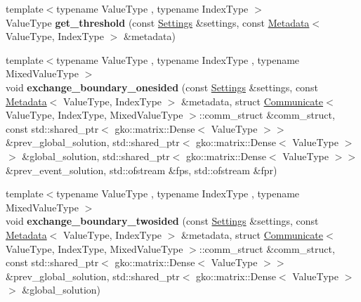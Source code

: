 \begin{DoxyCompactItemize}
\item 
\mbox{\label{namespaceschwz_a77f43267a5630bb5e4a86e9634c69fe9}} 
{\footnotesize template$<$typename Value\+Type , typename Index\+Type $>$ }\\Value\+Type {\bfseries get\+\_\+threshold} (const \hyperlink{structschwz_1_1Settings}{Settings} \&settings, const \hyperlink{structschwz_1_1Metadata}{Metadata}$<$ Value\+Type, Index\+Type $>$ \&metadata)
\item 
\mbox{\label{namespaceschwz_a4e81df68d1918c37ac0c1d4a9a406ba9}} 
{\footnotesize template$<$typename Value\+Type , typename Index\+Type , typename Mixed\+Value\+Type $>$ }\\void {\bfseries exchange\+\_\+boundary\+\_\+onesided} (const \hyperlink{structschwz_1_1Settings}{Settings} \&settings, const \hyperlink{structschwz_1_1Metadata}{Metadata}$<$ Value\+Type, Index\+Type $>$ \&metadata, struct \hyperlink{classschwz_1_1Communicate}{Communicate}$<$ Value\+Type, Index\+Type, Mixed\+Value\+Type $>$\+::comm\+\_\+struct \&comm\+\_\+struct, const std\+::shared\+\_\+ptr$<$ gko\+::matrix\+::\+Dense$<$ Value\+Type $>$$>$ \&prev\+\_\+global\+\_\+solution, std\+::shared\+\_\+ptr$<$ gko\+::matrix\+::\+Dense$<$ Value\+Type $>$$>$ \&global\+\_\+solution, std\+::shared\+\_\+ptr$<$ gko\+::matrix\+::\+Dense$<$ Value\+Type $>$$>$ \&prev\+\_\+event\+\_\+solution, std\+::ofstream \&fps, std\+::ofstream \&fpr)
\item 
\mbox{\label{namespaceschwz_a1f69ce81eaf85081073d0f45e11ce149}} 
{\footnotesize template$<$typename Value\+Type , typename Index\+Type , typename Mixed\+Value\+Type $>$ }\\void {\bfseries exchange\+\_\+boundary\+\_\+twosided} (const \hyperlink{structschwz_1_1Settings}{Settings} \&settings, const \hyperlink{structschwz_1_1Metadata}{Metadata}$<$ Value\+Type, Index\+Type $>$ \&metadata, struct \hyperlink{classschwz_1_1Communicate}{Communicate}$<$ Value\+Type, Index\+Type, Mixed\+Value\+Type $>$\+::comm\+\_\+struct \&comm\+\_\+struct, const std\+::shared\+\_\+ptr$<$ gko\+::matrix\+::\+Dense$<$ Value\+Type $>$$>$ \&prev\+\_\+global\+\_\+solution, std\+::shared\+\_\+ptr$<$ gko\+::matrix\+::\+Dense$<$ Value\+Type $>$$>$ \&global\+\_\+solution)
\item 
\mbox{\label{namespaceschwz_a1149b1cad510b1ae7285480c970fd2b3}} 
$$
\end{DoxyCompactItemize}
